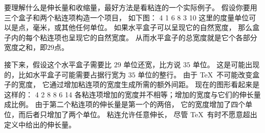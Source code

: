 {%
要理解什么是伸长量和收缩量，最好方法是看粘连的一个实际例子。
假设你要用三个盒子和两个粘连项构造一个项目，
如下图：
 {  4 1 6   8 3 10  }
\noindent
这里的度量单位可以是点，毫米，或其他任何单位。
如果水平盒子可以呈现它的自然宽度，
那么盒子内的每个粘连项也呈现它的自然宽度。
从而水平盒子的总宽度就是它个各部分宽度之和，即$29$点。

接下来，假设这个水平盒子需要比 $29$ 单位还宽，比方说 $35$ 单位。
这是可能出现的，比如水平盒子可能需要占据行宽为 $35$ 单位的整行。
由于 \TeX\ 不可能改变盒子的宽度，
它通过增加粘连项的宽度生成所需的额外间距。
现在的图形看起来是这样的：
 {  4 2 8   8 6 14  }
各粘连项增加的宽度并不相等；增加的宽度与它们的伸长量成比例。
由于第二个粘连项的伸长量是第一个的两倍，
它的宽度增加了四个单位，而后者只增加了两个单位。
粘连允许任意伸长，
尽管 \TeX\ 有时不愿意超出定义中给出的伸长量。

}
